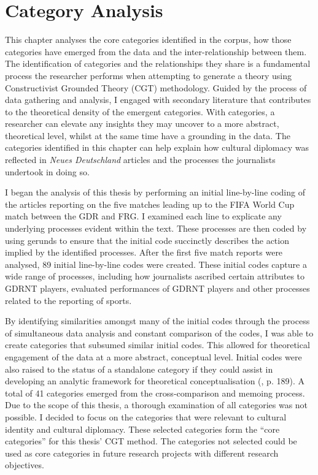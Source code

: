 \chapter{Category Analysis\label{cha:catanalysis}}

This chapter analyses the core categories identified in the corpus, how those categories have emerged from the data and the inter-relationship between them. The identification of categories and the relationships they share is a fundamental process the researcher performs when attempting to generate a theory using Constructivist Grounded Theory (CGT) methodology. Guided by the process of data gathering and analysis, I engaged with secondary literature that contributes to the theoretical density of the emergent categories. With categories, a researcher can elevate any insights they may uncover to a more abstract, theoretical level, whilst at the same time have a grounding in the data. The categories identified in this chapter can help explain how cultural diplomacy was reflected in \textit{Neues Deutschland} articles and the processes the journalists undertook in doing so.

I began the analysis of this thesis by performing an initial line-by-line coding of the articles reporting on the five matches leading up to the FIFA World Cup match between the GDR and FRG. I examined each line to explicate any underlying processes evident within the text. These processes are then coded by using gerunds to ensure that the initial code succinctly describes the action implied by the identified processes. After the first five match reports were analysed, 89 initial line-by-line codes were created. These initial codes capture a wide range of processes, including how journalists ascribed certain attributes to GDRNT players, evaluated performances of GDRNT players and other processes related to the reporting of sports.

By identifying similarities amongst many of the initial codes through the process of simultaneous data analysis and constant comparison of the codes, I was able to create categories that subsumed similar initial codes. This allowed for theoretical engagement of the data at a more abstract, conceptual level. Initial codes were also raised to the status of a standalone category if they could assist in developing an analytic framework for theoretical conceptualisation (\cite{charmaz2014}, p. 189). A total of 41 categories emerged from the cross-comparison and memoing process. Due to the scope of this thesis, a thorough examination of all categories was not possible. I decided to focus on the categories that were relevant to cultural identity and cultural diplomacy. These selected categories form the “core categories” for this thesis’ CGT method. The categories not selected could be used as core categories in future research projects with different research objectives.

